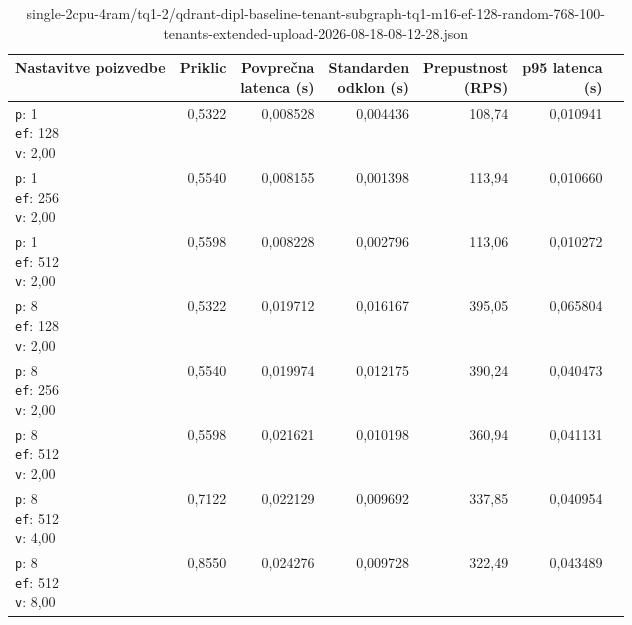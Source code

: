 \begin{table}[htbp]
  \centering
\small
  \caption{single-2cpu-4ram/tq1-2/qdrant-dipl-baseline-tenant-subgraph-tq1-m16-ef-128-random-768-100-tenants-extended-upload-2026-08-18-08-12-28.json}
  \label{tab:single-2cpu-4ram:tq1-2:qdrant-dipl-baseline-tenant-subgraph-tq1-m16-ef-128-random-768-100-tenants-extended-upload-2026-08-18-08-12-28.json}
  \begin{tabularx}{\textwidth}{Xrrrrrr}
    \toprule
    Nastavitve poizvedbe & Priklic & \makecell{Povprečna\\latenca (s)} & \makecell{Standarden\\odklon (s)} & \makecell{Prepustnost\\(RPS)} & \makecell{p95 latenca\\(s)}  \\
    \midrule
    \makecell{\texttt{p}: 1\\\texttt{ef}: 128\\\texttt{v}: 2,00} & 0,5322 & 0,008528 & 0,004436 & 108,74 & 0,010941 \\
    \makecell{\texttt{p}: 1\\\texttt{ef}: 256\\\texttt{v}: 2,00} & 0,5540 & 0,008155 & 0,001398 & 113,94 & 0,010660 \\
    \makecell{\texttt{p}: 1\\\texttt{ef}: 512\\\texttt{v}: 2,00} & 0,5598 & 0,008228 & 0,002796 & 113,06 & 0,010272 \\
    \makecell{\texttt{p}: 8\\\texttt{ef}: 128\\\texttt{v}: 2,00} & 0,5322 & 0,019712 & 0,016167 & 395,05 & 0,065804 \\
    \makecell{\texttt{p}: 8\\\texttt{ef}: 256\\\texttt{v}: 2,00} & 0,5540 & 0,019974 & 0,012175 & 390,24 & 0,040473 \\
    \makecell{\texttt{p}: 8\\\texttt{ef}: 512\\\texttt{v}: 2,00} & 0,5598 & 0,021621 & 0,010198 & 360,94 & 0,041131 \\
    \makecell{\texttt{p}: 8\\\texttt{ef}: 512\\\texttt{v}: 4,00} & 0,7122 & 0,022129 & 0,009692 & 337,85 & 0,040954 \\
    \makecell{\texttt{p}: 8\\\texttt{ef}: 512\\\texttt{v}: 8,00} & 0,8550 & 0,024276 & 0,009728 & 322,49 & 0,043489 \\

\end{tabularx}
\end{table}

